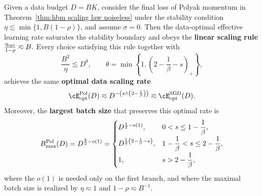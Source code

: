 \begin{theorem}
\label{thm:polyak data scaling noiseless}
Given a data budget \(D=BK\), consider the final loss of Polyak momentum in Theorem~\ref{thm:hbm scaling law noiseless} under the stability condition \(\eta\lesssim\min\{1,B(1-\rho)\}\), and assume \(\sigma=0\). Then the data-optimal effective learning rate saturates the stability boundary and obeys the \textbf{linear scaling rule}
\(\frac{\eta_{\rm opt}}{1-\rho}\eqsim B .\)
Every choice satisfying this rule together with
\[
    \frac{B^{2}}{\eta}\lesssim D^{\theta},
    \qquad
    \theta=\min\left\{1,\left(2-\frac1\beta-s\right)_{+}\right\},
\]
achieves the same \textbf{optimal data scaling rate}
\[
    \cE_{\rm opt}^{\rm Pol}(D)
    \eqsim
    D^{-\left(s\wedge\left(2-\frac1\beta\right)\right)}
    \eqsim
    \cE_{\rm opt}^{\rm SGD}(D).
\]
Moreover, the \textbf{largest batch size} that preserves this optimal rate is
\[
    B_{\max}^{\rm Pol}(D)
    =
    D^{\frac{\theta}{2}-o(1)}
    =
    \begin{cases}
    D^{\frac12-o(1)},
    & 0<s\leq1-\dfrac1\beta,\\[2mm]
    D^{\frac12\left(2-\frac1\beta-s\right)},
    & 1-\dfrac1\beta<s\leq2-\dfrac1\beta,\\[2mm]
    1,
    & s>2-\dfrac1\beta,
    \end{cases}
\]
where the \(o(1)\) is needed only on the first branch, and where the maximal batch size is realized by \(\eta\eqsim1\) and \(1-\rho\eqsim B^{-1}\).
\end{theorem}

